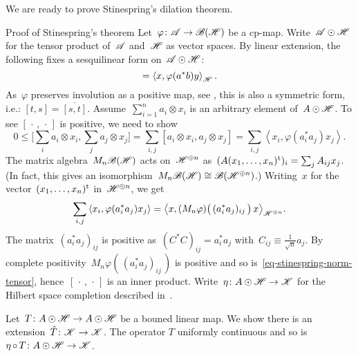\documentclass[b]{subfiles}
\begin{document}
\begin{parsec}%
\begin{point}%
We are ready to prove Stinespring's dilation theorem.
\begin{point}{Proof of Stinespring's theorem }%
Let~$\varphi\colon \mathscr{A} \to \mathscr{B}(\mathscr{H})$
    be a cp-map.
Write~$\mathscr{A} \odot \mathscr{H}$ for the tensor product of~$\mathscr{A}$ and~$\mathscr{H}$
    as vector spaces.
By linear extension,
the following fixes a sesquilinear form on~$\mathscr{A} \odot \mathscr{H}$:
\begin{equation*}
    [a\otimes x, b \otimes y] = \left<x, \varphi(a^*b)y\right>_{\scrH}.
\end{equation*}
As~$\varphi$ preserves involution as a positive map,
see , this is also a symmetric form, i.e.: $[t,s]=\overline{[s,t]}$.
    Assume~$\sum^n_{i=1} a_i\otimes x_i$
is an arbitrary element of~$A \odot \mathscr{H}$.
To see $[\,\cdot\,,\,\cdot\,]$ is positive,
we need to show
\begin{equation*}
    0 \leq \bigl[\sum_i a_i\otimes x_i, \sum_j a_j\otimes x_j\bigr]
        = \sum_{i,j} [a_i\otimes x_i, a_j\otimes x_j]
        = \sum_{i,j} \left< x_i, \varphi(a_i^*a_j) x_j \right>.
\end{equation*}
The matrix algebra~$M_n\mathscr{B}(\mathscr{H})$
acts on~$\mathscr{H}^{\oplus n}$
as~$(A (x_1,\ldots,x_n)^{\mathrm{t}})_i = \sum_j A_{ij} x_j$.
(In fact, this gives an
    isomorphism~$M_n\mathscr{B}(\mathscr{H}) \cong \mathscr{B}(\mathscr{H}^{\oplus n})$.)
Writing~$x$ for the vector~$(x_1,\ldots,x_n)^{\mathrm{t}}$ in~$\mathscr{H}^{\oplus n}$,
    we get
\begin{equation}\label{eq-stinespring-norm-tensor}
    \sum_{i,j} \left< x_i, \varphi(a_i^*a_j) x_j \right>
    = \bigl<
    x,
    (M_n\varphi) \bigl(\, (a_i^*a_j)_{ij} \, \bigr)\,
    x \bigr>_{\mathscr{H}^{\oplus n}}.
\end{equation}
The matrix~$(a_i^*a_j)_{ij}$
is positive as~$(C^*C)_{ij} = a_i^*a_j$
    with~$C_{ij} \equiv \frac{1}{\sqrt{n}} a_j$.
    By complete positivity~$M_n\varphi(\,(a_i^*a_j)_{ij}\,)$ is positive
    and so is~\eqref{eq-stinespring-norm-tensor},
    hence~$[\,\cdot\,,\,\cdot\,]$ is an inner product.
Write~$\eta\colon A\odot \mathscr{H} \to \mathscr{K}$ for the Hilbert space completion
    described in~.
\begin{point}%
Let~$T\colon A \odot \mathscr{H} \to A \odot \mathscr{H}$
be a bouned linear map.
We show there is an extension~$\hat{T} \colon \mathscr{K} \to \mathscr{K}$.
The operator $T$
uniformly continuous and so is~$\eta\mathop{\circ} T \colon A\odot\mathscr{H} \to\mathscr{K}$.

\end{point}
\end{point}
\end{point}
\end{parsec}
\end{document}
